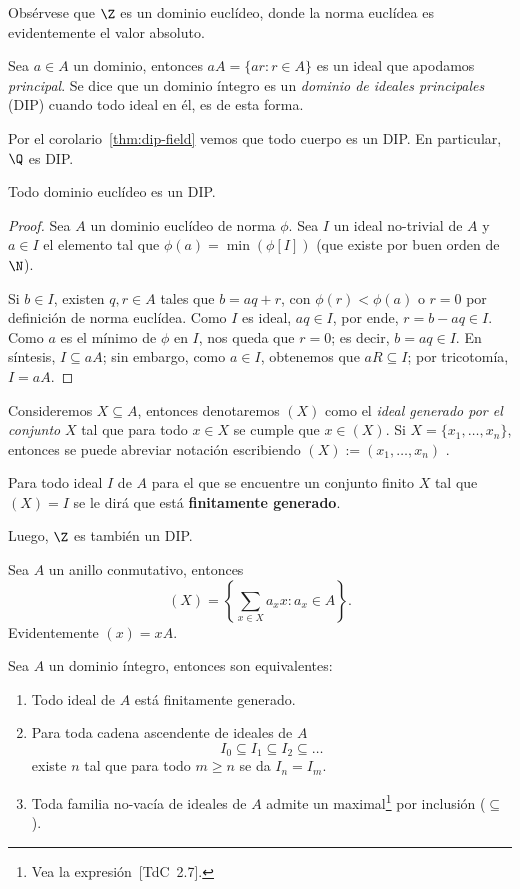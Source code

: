 \documentclass[11pt,oneside]{book}
\begin{document}
Obsérvese que $\Z$ es un dominio euclídeo, donde la norma euclídea es evidentemente el valor absoluto.
\begin{mydef}
Sea $a\in A$ un dominio, entonces $aA=\{ar:r\in A\}$ es un ideal que apodamos \textit{principal}. Se dice que un dominio íntegro es un \textit{dominio de ideales principales} (DIP) cuando todo ideal en él, es de esta forma.
\end{mydef}
Por el corolario~\ref{thm:dip-field} vemos que todo cuerpo es un DIP. En particular, $\Q$ es DIP.
\begin{thm}
Todo dominio euclídeo es un DIP.
\end{thm}
\begin{proof}
Sea $A$ un dominio euclídeo de norma $\phi$. Sea $I$ un ideal no-trivial de $A$ y $a\in I$ el elemento tal que $\phi(a)=\min(\phi[I])$ (que existe por buen orden de $\N$).

Si $b\in I$, existen $q,r\in A$ tales que $b=aq+r$, con $\phi(r)\lt\phi(a)$ o $r=0$ por definición de norma euclídea. Como $I$ es ideal, $aq\in I$, por ende, $r=b-aq\in I$. Como $a$ es el mínimo de $\phi$ en $I$, nos queda que $r=0$; es decir, $b=aq\in I$. En síntesis, $I\subseteq aA$; sin embargo, como $a\in I$, obtenemos que $aR\subseteq I$; por tricotomía, $I=aA$.
\end{proof}
\begin{mydef}
Consideremos $X\subseteq A$, entonces denotaremos $(X)$ como el \textit{ideal generado por el conjunto} $X$ tal que para todo $x\in X$ se cumple que $x\in(X)$. Si $X=\{x_1,\dots,x_n\}$, entonces se puede abreviar notación escribiendo $(X):=(x_1,\dots,x_n)$ .

Para todo ideal $I$ de $A$ para el que se encuentre un conjunto finito $X$ tal que $(X)=I$ se le dirá que está \textbf{finitamente generado}.
\end{mydef}
Luego, $\Z$ es también un DIP.
\begin{thm}
Sea $A$ un anillo conmutativo, entonces
$$(X)=\left\{\sum_{x\in X}a_xx:a_x\in A\right\}.$$
Evidentemente $(x)=xA$.
\end{thm}
\begin{thm}\label{thm:equivalent-forms-of-noetherian}
Sea $A$ un dominio íntegro, entonces son equivalentes:
\begin{enumerate}[(1)]
\item Todo ideal de $A$ está finitamente generado.
\item Para toda cadena ascendente de ideales de $A$
$$I_0\subseteq I_1\subseteq I_2\subseteq\dots$$
existe $n$ tal que para todo $m\geq n$ se da $I_n=I_m$.
\item Toda familia no-vacía de ideales de $A$ admite un maximal\footnote{Vea la expresión~[TdC~2.7].} por inclusión ($\subseteq$).
\end{enumerate}
\end{thm}
\end{document}
